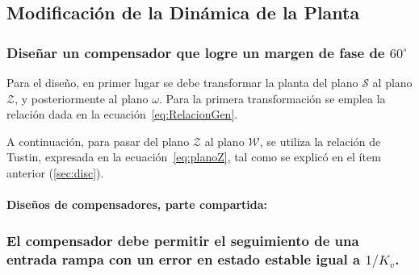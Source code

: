 \subsection{Modificación de la Dinámica de la Planta}
\subsubsection{Diseñar un compensador que logre un margen de fase de $60^\circ$} 

Para el diseño, en primer lugar se debe transformar la planta del plano $\mathcal{S}$ al plano $\mathcal{Z}$, y posteriormente al plano $\mathcal{\omega}$. Para la primera transformación se emplea la relación dada en la ecuación~\ref{eq:RelacionGen}.  

A continuación, para pasar del plano $\mathcal{Z}$ al plano $\mathcal{W}$, se utiliza la relación de Tustin, expresada en la ecuación~\ref{eq:planoZ}, tal como se explicó en el ítem anterior (\ref{sec:disc}).

\paragraph{Diseños de compensadores, parte compartida:}

\subsubsection{El compensador debe permitir el seguimiento de una entrada rampa con un error en estado estable igual a $1/K_v$.}
